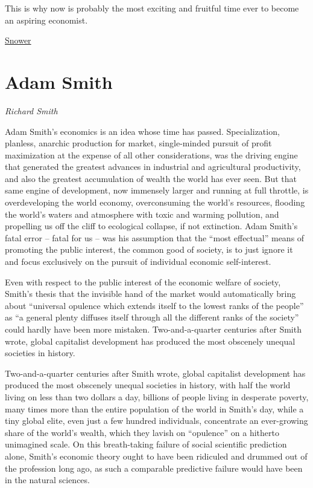 \documentclass[
]{book}
\begin{document}
This is why now is probably the most exciting and fruitful time ever to become an aspiring economist.

\href{https://evonomics.com/why-behavioral-economics-cant-fix-a-broken-discipline/}{Snower}

\hypertarget{adam-smith}{%
\section{Adam Smith}\label{adam-smith}}

\emph{Richard Smith}

Adam Smith's economics is an idea whose time has passed. Specialization, planless,
anarchic production for market, single-minded pursuit of profit maximization at the
expense of all other considerations, was the driving engine that generated the
greatest advances in industrial and agricultural productivity, and also the greatest
accumulation of wealth the world has ever seen. But that same engine of
development, now immensely larger and running at full throttle, is overdeveloping
the world economy, overconsuming the world's resources, flooding the world's
waters and atmosphere with toxic and warming pollution, and propelling us off the
cliff to ecological collapse, if not extinction. Adam Smith's fatal error -- fatal for us
-- was his assumption that the ``most effectual'' means of promoting the public
interest, the common good of society, is to just ignore it and focus exclusively on the
pursuit of individual economic self-interest.

Even with respect to the public interest of the economic welfare of society, Smith's
thesis that the invisible hand of the market would automatically bring about
``universal opulence which extends itself to the lowest ranks of the people'' as ``a
general plenty diffuses itself through all the different ranks of the society'' could
hardly have been more mistaken. Two-and-a-quarter centuries after Smith wrote,
global capitalist development has produced the most obscenely unequal societies in
history.

Two-and-a-quarter centuries after Smith wrote,
global capitalist development has produced the most obscenely unequal societies in
history, with half the world living on less than two dollars a day, billions of people
living in desperate poverty, many times more than the entire population of the world
in Smith's day, while a tiny global elite, even just a few hundred individuals,
concentrate an ever-growing share of the world's wealth, which they lavish on
``opulence'' on a hitherto unimagined scale. On this breath-taking failure of social
scientific prediction alone, Smith's economic theory ought to have been ridiculed
and drummed out of the profession long ago, as such a comparable predictive failure
would have been in the natural sciences.
\end{document}

